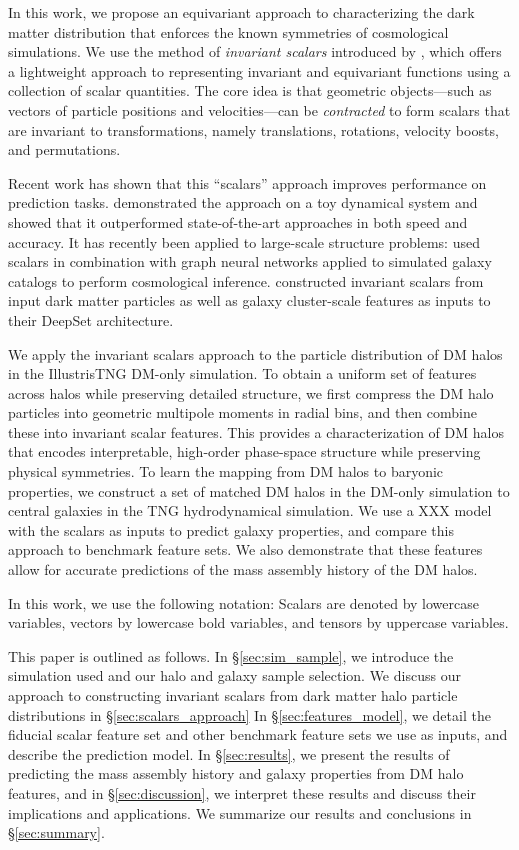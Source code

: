 In this work, we propose an equivariant approach to characterizing the dark matter distribution that enforces the known symmetries of cosmological simulations. 
We use the method of \emph{invariant scalars} introduced by \cite{Villar2021a}, which offers a lightweight approach to representing invariant and equivariant functions using a collection of scalar quantities.
The core idea is that geometric objects---such as vectors of particle positions and velocities---can be \emph{contracted} to form scalars that are invariant to transformations, namely translations, rotations, velocity boosts, and permutations.

Recent work has shown that this ``scalars'' approach improves performance on prediction tasks.
\cite{yao_simple_2021} demonstrated the approach on a toy dynamical system and showed that it outperformed state-of-the-art approaches in both speed and accuracy.
It has recently been applied to large-scale structure problems: \cite{villanueva-domingo_learning_2022} used scalars in combination with graph neural networks applied to simulated galaxy catalogs to perform cosmological inference.
\cite{thiele_predicting_2022} constructed invariant scalars from input dark matter particles as well as galaxy cluster-scale features as inputs to their DeepSet architecture.

We apply the invariant scalars approach to the particle distribution of DM halos in the IllustrisTNG DM-only simulation.
To obtain a uniform set of features across halos while preserving detailed structure, we first compress the DM halo particles into geometric multipole moments in radial bins, and then combine these into invariant scalar features.
This provides a characterization of DM halos that encodes interpretable, high-order phase-space structure while preserving physical symmetries.
To learn the mapping from DM halos to baryonic properties, we construct a set of matched DM halos in the DM-only simulation to central galaxies in the TNG hydrodynamical simulation.
We use a XXX model with the scalars as inputs to predict galaxy properties, and compare this approach to benchmark feature sets. 
We also demonstrate that these features allow for accurate predictions of the mass assembly history of the DM halos.

In this work, we use the following notation: 
Scalars are denoted by lowercase variables, vectors by lowercase bold variables, and tensors by uppercase variables.

This paper is outlined as follows.
In \S\ref{sec:sim_sample}, we introduce the simulation used and our halo and galaxy sample selection. 
We discuss our approach to constructing invariant scalars from dark matter halo particle distributions in \S\ref{sec:scalars_approach} 
In \S\ref{sec:features_model}, we detail the fiducial scalar feature set and other benchmark feature sets we use as inputs, and describe the prediction model.
In \S\ref{sec:results}, we present the results of predicting the mass assembly history and galaxy properties from DM halo features, and in \S\ref{sec:discussion}, we interpret these results and discuss their implications and applications.
We summarize our results and conclusions in \S\ref{sec:summary}.


